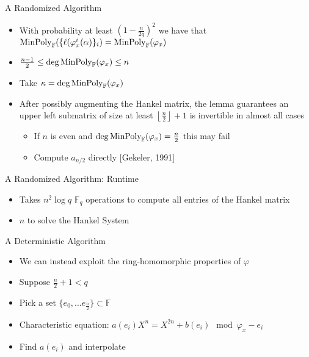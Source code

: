 \documentclass{beamer}
\newcommand{\minpol}{\textnormal{MinPoly}_{\mathbb{F}}}
\newcommand{\f}{\mathbb{F}}
\begin{document}




\begin{frame}{A Randomized Algorithm}

\begin{itemize}
    \item  With probability at least $(1 - \frac{n}{2q})^2$ we have that $\minpol(\{\ell(\varphi_x^i(\alpha)\}_i) = \minpol(\varphi_x)$
    \item $\frac{n-1}{2} \leq \deg \minpol(\varphi_x) \leq n$
    \item Take $\kappa = \deg \minpol(\varphi_x)$
    \item After possibly augmenting the Hankel matrix, the lemma guarantees an upper left submatrix of size at least $\left\lfloor \frac{n}{2} \right\rfloor + 1$ is invertible in almost all cases
    \begin{itemize}
        \item If $n$ is even and $\deg \minpol(\varphi_x) = \frac{n}{2}$ this may fail
        \item Compute $a_{n/2}$ directly [Gekeler, 1991]
    \end{itemize}
\end{itemize}
    
\end{frame}



\begin{frame}{A Randomized Algorithm: Runtime}
    \begin{itemize}
        \item Takes $n^2 \log q$ $\f_q$ operations to compute all entries of the Hankel matrix
    \item $n$ to solve the Hankel System
    \end{itemize}
\end{frame}


\begin{frame}{A Deterministic Algorithm}

\begin{itemize}
    \item We can instead exploit the ring-homomorphic properties of $\varphi$
    \item Suppose $ \frac{n}{2} + 1 < q$
    \item Pick a set $\{e_0, \ldots e_{\frac{n}{2}}\} \subset \mathbb{F}$
    \item Characteristic equation: $a(e_i) X^n  = X^{2n} + b(e_i) \mod \varphi_{x} - e_i $
    \item Find $a(e_i)$ and interpolate
\end{itemize}
    
\end{frame}
\end{document}
